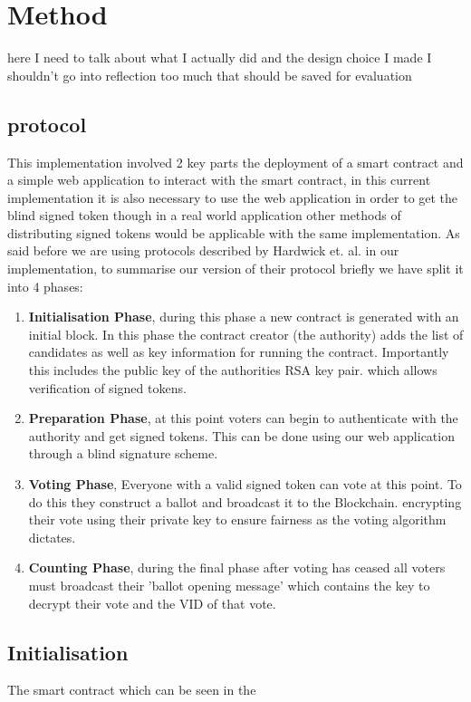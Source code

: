 \documentclass{entcs}
\begin{document}
\section{Method}
here I need to talk about what I actually did and the design choice I made I shouldn't go into reflection too much that should be saved for evaluation

\subsection{protocol}
This implementation involved 2 key parts the deployment of a smart contract and a simple web application to interact with the smart contract, in this current implementation it is also necessary to use the web application in order to get the blind signed token though in a real world application other methods of distributing signed tokens would be applicable with the same implementation.
As said before we are using protocols described by Hardwick et. al. in our implementation, to summarise our version of their protocol briefly we have split it into 4 phases:
\begin{enumerate}
    \item \textbf{Initialisation Phase}, during this phase a new contract is generated with an initial block. In this phase the contract creator (the authority) adds the list of candidates as well as key information for running the contract. Importantly this includes the public key of the authorities RSA key pair. which allows verification of signed tokens.
    \item \textbf{Preparation Phase}, at this point voters can begin to authenticate with the authority and get signed tokens. This can be done using our web application through a blind signature scheme.
    \item \textbf{Voting Phase}, Everyone with a valid signed token can vote at this point. To do this they construct a ballot and broadcast it to the Blockchain. encrypting their vote using their private key to ensure fairness as the voting algorithm dictates.
    \item \textbf{Counting Phase}, during the final phase after voting has ceased all voters must broadcast their 'ballot opening message' which contains the key to decrypt their vote and the VID of that vote.
\end{enumerate}

\subsection{Initialisation}
The smart contract which can be seen in the 
\end{document}
